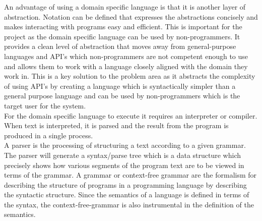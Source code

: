 An advantage of using a domain specific language is that it is another layer of abstraction. Notation can be defined that expresses the abstractions concisely and makes interacting with programs easy and efficient. This is important for the project as the domain specific language can be used by non-programmers. It provides a clean level of abstraction that moves away from general-purpose languages and API’s which non-programmers are not competent enough to use and allows them to work with a language closely aligned with the domain they work in. This is a key solution to the problem area as it abstracts the complexity of using API’s by creating a language which is syntactically simpler than a general purpose language and can be used by non-programmers which is the target user for the system. \\

For the domain specific language to execute it requires an interpreter or compiler. When text is interpreted, it is parsed and the result from the program is produced in a single process. \\

A parser is the processing of structuring a text according to a given grammar. The parser will generate a syntax/parse tree which is a data structure which precisely shows how various segments of the program text are to be viewed in terms of the grammar. A grammar or context-free grammar are the formalism for describing the structure of programs in a programming language by describing the syntactic structure. Since the semantics of a language is defined in terms of the syntax, the context-free-grammar is also instrumental in the definition of the semantics. \\